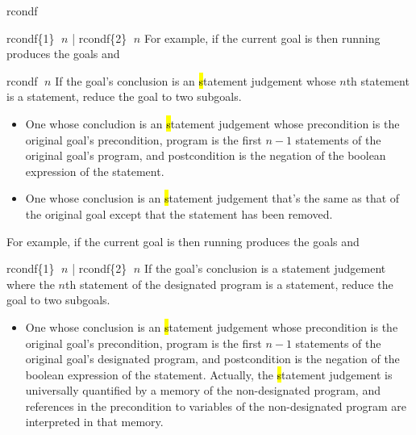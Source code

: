 \begin{tactic}{rcondf}
\begin{tsyntax}{rcondf\{1\} $\;n$ | rcondf\{2\} $\;n$}
  \medskip
  For example, if the current goal is
   then
  running 
  produces the goals
  and
  \end{tsyntax}

  \begin{tsyntax}{rcondf $\;n$}
    If the goal's conclusion is an \hl statement judgement whose $n$th
    statement is a  statement, reduce the goal to two
    subgoals.
    \begin{itemize}
    \item One whose concludion is an \hl statement judgement whose
      precondition is the original goal's precondition, program is the
      first $n-1$ statements of the original goal's program, and
      postcondition is the negation of the boolean expression of the
       statement.
   
    \item One whose conclusion is an \hl statement judgement that's
      the same as that of the original goal except that the 
      statement has been removed.
    \end{itemize}

    \medskip For example, if the current goal is
     then
    running 
    produces the goals
     and
  \end{tsyntax}

  \begin{tsyntax}{rcondf\{1\} $\;n$ | rcondf\{2\} $\;n$}
    If the goal's conclusion is a \prhl statement judgement where the
    $n$th statement of the designated program is a  statement,
    reduce the goal to two subgoals.
    \begin{itemize}
    \item One whose conclusion is an \hl statement judgement whose
      precondition is the original goal's precondition, program is the
      first $n-1$ statements of the original goal's designated
      program, and postcondition is the negation of the boolean
      expression of the  statement. Actually, the \hl
      statement judgement is universally quantified by a memory of the
      non-designated program, and references in the precondition to
      variables of the non-designated program are interpreted in that
      memory.
   

\end{itemize}
\end{tsyntax}
\end{tactic}

